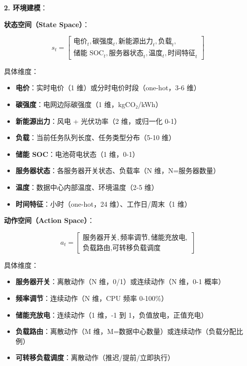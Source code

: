 \documentclass[12pt,a4paper]{article}
\begin{document}
\textbf{2. 环境建模}：

\textbf{状态空间（State Space）}：

\begin{equation}
s_t = \left[ 
\begin{array}{l}
\text{电价}_t, \text{碳强度}_t, \text{新能源出力}_t, \text{负载}_t, \\
\text{储能 SOC}_t, \text{服务器状态}_t, \text{温度}_t, \text{时间特征}_t
\end{array}
\right]
\label{eq:rl-state}
\end{equation}

具体维度：
\begin{itemize}
    \item \textbf{电价}：实时电价（1 维）或分时电价时段（one-hot，3-6 维）
    \item \textbf{碳强度}：电网边际碳强度（1 维，kgCO₂/kWh）
    \item \textbf{新能源出力}：风电 + 光伏功率（2 维，或归一化 0-1）
    \item \textbf{负载}：当前任务队列长度、任务类型分布（5-10 维）
    \item \textbf{储能 SOC}：电池荷电状态（1 维，0-1）
    \item \textbf{服务器状态}：各服务器开关状态、负载率（N 维，N=服务器数量）
    \item \textbf{温度}：数据中心内部温度、环境温度（2-5 维）
    \item \textbf{时间特征}：小时（one-hot，24 维）、工作日/周末（1 维）
\end{itemize}

\textbf{动作空间（Action Space）}：

\begin{equation}
a_t = \left[ 
\begin{array}{l}
\text{服务器开关}, \text{频率调节}, \text{储能充放电}, \\
\text{负载路由}, \text{可转移负载调度}
\end{array}
\right]
\label{eq:rl-action}
\end{equation}

具体维度：
\begin{itemize}
    \item \textbf{服务器开关}：离散动作（N 维，0/1）或连续动作（N 维，0-1 概率）
    \item \textbf{频率调节}：连续动作（N 维，CPU 频率 0-100\%）
    \item \textbf{储能充放电}：连续动作（1 维，-1 到 1，负值放电，正值充电）
    \item \textbf{负载路由}：离散动作（M 维，M=数据中心数量）或连续动作（负载分配比例）
    \item \textbf{可转移负载调度}：离散动作（推迟/提前/立即执行）
\end{itemize}
\end{document}
